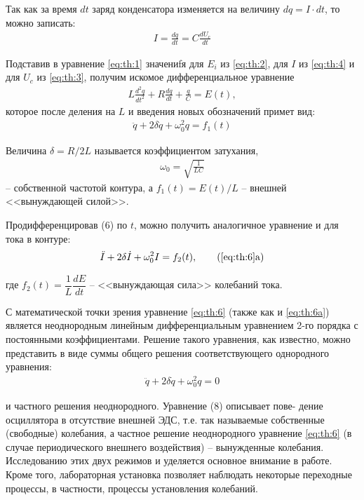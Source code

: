 Так как за время \( dt \) заряд конденсатора изменяется на величину  
\( dq = I \cdot dt \), то можно записать:
\begin{align} \label{eq:th:4}
	I = \frac{dq}{dt} = C \frac{dU_c}{dt}
\end{align}

Подставив в уравнение \cref{eq:th:1} значениfя для \( E_i \) из \cref{eq:th:2}, для \( I \) из \cref{eq:th:4} и для \( U_c \) из \cref{eq:th:3}, получим искомое дифференциальное уравнение
\begin{align} \label{eq:th:5}
	L \frac{d^2 q}{dt^2} + R \frac{dq}{dt} + \frac{q}{C} = E(t), 
\end{align}
которое после деления на \( L \) и введения новых обозначений примет  
вид:
\begin{align} \label{eq:th:6}
	\ddot{q} + 2\delta \dot{q} + \omega_0^2 q = f_1(t)
\end{align}

Величина \( \delta = R/2L \) называется коэффициентом затухания,
\begin{align} \label{eq:th:7}
	\omega_0 = \sqrt{\frac{1}{LC}} 
\end{align}
-- собственной частотой контура, а \( f_1(t) = E(t)/L \) -- внешней <<вынуждающей силой>>.

Продифференцировав (6) по \( t \), можно получить аналогичное  
уравнение и для тока в контуре:
\begin{align} \label{eq:th:6a}
	\ddot{I} + 2\delta \dot{I} + \omega_0^2 I = f_2(t), \tag{\ref{eq:th:6}a}
\end{align}

где \( f_2(t) = \dfrac{1}{L} \dfrac{dE}{dt} \) -- <<вынуждающая сила>> колебаний тока.

С математической точки зрения уравнение \cref{eq:th:6} (также как и \cref{eq:th:6a})  
является неоднородным линейным дифференциальным уравнением 2-го порядка с постоянными коэффициентами. Решение такого  
уравнения, как известно, можно представить в виде суммы общего решения соответствующего однородного уравнения:
\begin{align} \label{eq:th:8}
	\ddot{q} + 2\delta \dot{q} + \omega_0^2 q = 0
\end{align} 

и частного решения неоднородного. Уравнение (8) описывает пове-
дение осциллятора в отсутствие внешней ЭДС, т.е. так называемые  
собственные (свободные) колебания, а частное решение неоднородного уравнение \cref{eq:th:6} (в случае периодического внешнего воздействия) -- вынужденные колебания. Исследованию этих двух режимов и уделяется основное внимание в работе. Кроме того, лабораторная установка позволяет наблюдать некоторые переходные процессы, в частности, процессы установления колебаний.

